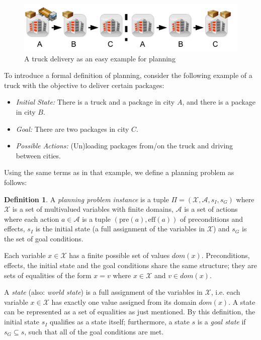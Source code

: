 \documentclass{article}
\theoremstyle{definition}
\newtheorem{defn}{Definition}
\begin{document}
\begin{figure}[h]
\begin{center}
\includegraphics[width=12cm]{plan-example.pdf}
\caption{A truck delivery as an easy example for planning}
\end{center}
\end{figure}

To introduce a formal definition of planning, consider the following example of a truck with the objective to deliver certain packages:
\begin{itemize}
\item \emph{Initial State:} There is a truck and a package in city $A$, and there is a package in city $B$.
\item \emph{Goal:} There are two packages in city $C$.
\item \emph{Possible Actions:} (Un)loading packages from/on the truck and driving between cities.
\end{itemize}

Using the same terms as in that example, we define a planning problem as follows:

\begin{defn}
A \emph{planning problem instance} is a tuple $\Pi = (\mathcal{X}, \mathcal{A}, s_I, s_G)$ where $\mathcal{X}$ is a set of multivalued variables with finite domains, $\mathcal{A}$ is a set of actions where each action $a \in \mathcal{A}$ is a tuple $(\text{pre}(a), \text{eff}(a))$ of preconditions and effects, $s_I$ is the initial state (a full assignment of the variables in $\mathcal{X}$) and $s_G$ is the set of goal conditions.
\end{defn}

Each variable $x \in \mathcal{X}$ has a finite possible set of values $\textit{dom}(x)$. Preconditions, effects, the initial state and the goal conditions share the same structure; they are sets of equalities of the form $x = v$ where $x \in \mathcal{X}$ and $v \in \textit{dom}(x)$.

A \emph{state} (also: \emph{world state}) is a full assignment of the variables in $\mathcal{X}$, i.e. each variable $x \in \mathcal{X}$ has exactly one value assigned from its domain $\textit{dom}(x)$. A state can be represented as a set of equalities as just mentioned. By this definition, the initial state $s_I$ qualifies as a state itself; furthermore, a state $s$ is a \emph{goal state} if $s_G \subseteq s$, such that all of the goal conditions are met.
\end{document}
